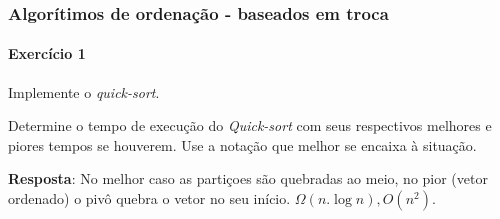 \begin{frame}
	\frametitle{Algorítimos de ordenação - baseados em troca}
	\framesubtitle{Exercício 1}
	\par Implemente o \textit{quick-sort}.
	\par Determine o tempo de execução do \textit{Quick-sort} com seus respectivos melhores e piores tempos se houverem. Use a notação que melhor se encaixa à situação.
	\pause
	\par \textbf{Resposta}: No melhor caso as partiçoes são quebradas ao meio, no pior (vetor ordenado) o pivô quebra o vetor no seu início. $\Omega(n.\log n), O(n^2)$.
	
\end{frame}



